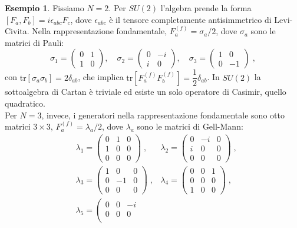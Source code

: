 \documentclass[12pt,a4paper]{article}
\theoremstyle{definition}
\newtheorem{exm}{Esempio}
\newcommand{\tr}{\mathrm{tr}}
\numberwithin{equation}{section}
\begin{document}
\begin{exm}
Fissiamo $N=2$. Per $SU(2)$ l'algebra prende la forma $[F_a,F_b]=i\epsilon_{abc}F_c$, dove $\epsilon_{abc}$ è il tensore completamente antisimmetrico di Levi-Civita. Nella rappresentazione fondamentale, $F_a^{(f)}=\sigma_a/2$, dove $\sigma_a$ sono le matrici di Pauli:
$$
\sigma_1=\left(\begin{matrix}
0 & 1 \\
1 & 0
\end{matrix}\right),\quad \sigma_2=\left(\begin{matrix}
0 & -i \\
i & 0
\end{matrix}\right),\quad \sigma_3=\left(\begin{matrix}
1 & 0 \\
0 & -1
\end{matrix}\right)\;,
$$
con $\tr[\sigma_a\sigma_b]=2\delta_{ab}$, che implica $\tr[F_a^{(f)}F_b^{(f)}]=\dfrac{1}{2}\delta_{ab}$. In $SU(2)$ la sottoalgebra di Cartan è triviale ed esiste un solo operatore di Casimir, quello quadratico. \\
Per $N=3$, invece, i generatori nella rappresentazione fondamentale sono otto matrici $3\times 3$, $F_a^{(f)}=\lambda_a/2$, dove $\lambda_a$ sono le matrici di Gell-Mann:
\begin{align*}
&\lambda_1=\begin{pmatrix}
0 & 1 & 0 \\
1 & 0 & 0 \\
0 & 0 & 0
\end{pmatrix}\;, &\lambda_2=\left(\begin{matrix}
0 & -i & 0 \\
i & 0 & 0 \\
0 & 0 & 0 
\end{matrix}\right)\;, \\
&\lambda_3=\left(\begin{matrix}
1 & 0 & 0 \\
0 & -1 & 0 \\
0 & 0 & 0
\end{matrix}\right)\;, &\lambda_4=\left(\begin{matrix}
0 & 0 & 1 \\
0 & 0 & 0 \\
1 & 0 & 0
\end{matrix}\right)\;, \\
&\lambda_5=\left(\begin{matrix}
0 & 0 & -i \\
0 & 0 & 0 \\

\end{matrix}
\end{align*}
\end{exm}
\end{document}

